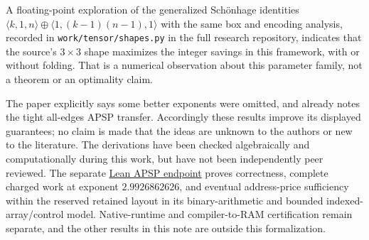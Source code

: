 \documentclass[11pt]{article}
\begin{document}
A floating-point exploration of the generalized Schönhage identities
$\langle k,1,n\rangle\oplus\langle1,(k-1)(n-1),1\rangle$ with the same box
and encoding analysis, recorded in \texttt{work/tensor/shapes.py} in the
full research repository,
indicates that the source's $3\times3$ shape maximizes the integer savings in
this framework, with or without folding. That is a numerical observation
about this parameter family, not a theorem or an optimality claim.

The paper explicitly says some better exponents were omitted, and already
notes the tight all-edges APSP transfer. Accordingly these results improve
its displayed guarantees; no claim is made that the ideas are unknown to
the authors or new to the literature. The derivations have been checked
algebraically and computationally during this work, but have not been
independently peer reviewed. The separate
\href{https://github.com/shreshth-s/thin-matrix-results/blob/main/lean/HalfSourceAPSPTheorem.lean}{Lean APSP endpoint}
proves correctness, complete charged work at exponent $2.9926862626$, and
eventual address-price sufficiency within the reserved retained layout in its binary-arithmetic and bounded
indexed-array/control model. Native-runtime and compiler-to-RAM certification
remain separate, and the other results in this note are outside this
formalization.
\end{document}
